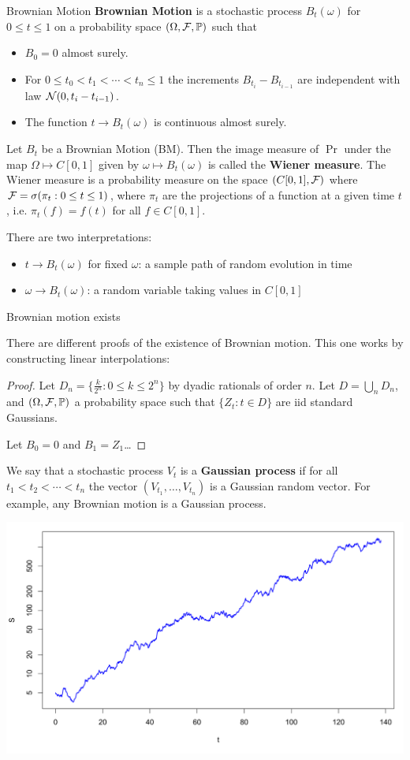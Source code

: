 \documentclass[../chapter01.tex]{subfile}
\begin{document}
\begin{Definition}{Brownian Motion}
{\bf Brownian Motion} is a stochastic process $B_t(\omega)$ for $0\le t \le 1$ on a probability space $(\Omega, \mathcal{F}, \mathbb{P})$ such that 
\begin{itemize}
  \item $B_0 = 0$ almost surely.
  \item For $0\le t_0 < t_1 < \cdots < t_n \le 1$ the increments $B_{t_i} - B_{t_{i-1}}$ are independent with law $\mathcal{N}(0, t_{i}-t_{i-1})$.
  \item The function $t \to B_t(\omega)$ is continuous almost surely.
\end{itemize}
\end{Definition}

Let $B_t$ be a Brownian Motion (BM). Then the image measure of $\Pr$ under the map $\Omega\mapsto C[0, 1]$ given by $\omega \mapsto B_{t}(\omega)$ is called the {\bf Wiener measure}.
The Wiener measure is a probability measure on the space $(C[0, 1], \mathcal{F})$ where $\mathcal{F} = \sigma(\pi_t: 0 \le t \le 1)$, where $\pi_t$ are the projections of a 
function at a given time $t$, i.e. $\pi_t(f) = f(t)$ for all $f \in C[0, 1]$. 

There are two interpretations:
\begin{itemize}
  \item $t \to B_t(\omega)$ for fixed $\omega$: a sample path of random evolution in time
  \item $\omega \to B_t(\omega)$: a random variable taking values in $C[0, 1]$
\end{itemize}

\begin{proposition}
Brownian motion exists
\end{proposition}

There are different proofs of the existence of Brownian motion. This one works by constructing linear interpolations:
\begin{proof}
Let $D_n = \{\frac{k}{2^n} : 0 \le k \le 2^{n}\}$ by dyadic rationals of order $n$. Let $D = \bigcup_n D_n$, and $(\Omega, \mathcal{F}, \mathbb{P})$ a probability space such that $\{Z_{t}: t\in D\}$ are iid 
standard Gaussians. 

Let $B_0 = 0$ and $B_1 = Z_1$\ldots   
\end{proof}

We say that a stochastic process $V_t$ is a {\bf Gaussian process} if for all $t_1 < t_2 < \cdots < t_{n}$ the vector $(V_{t_1},\ldots, V_{t_n})$ is a Gaussian random vector. 
For example, any Brownian motion is a Gaussian process. 

\begin{Figure}
\includegraphics{./figures/BM.svg}
\caption{Example Brownian Motion Path}
\end{Figure}
\end{document}
